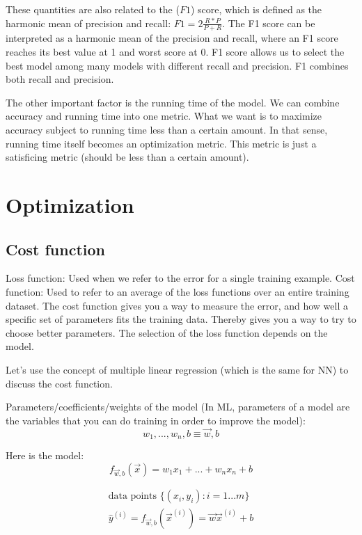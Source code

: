 \documentclass[12pt]{report}
\begin{document}
These quantities are also related to the ($F1$) score, which is defined as the harmonic mean of precision and recall: $F1 = 2 \frac{R * P}{ P + R } $. The F1 score can be interpreted as a harmonic mean of the precision and recall, where an F1 score reaches its best value at 1 and worst score at 0. F1 score allows us to select the best model among many models with different recall and precision. F1 combines both recall and precision.

The other important factor is the running time of the model. We can combine accuracy and running time into one metric. What we want is to maximize accuracy subject to running time less than a certain amount. In that sense, running time itself becomes an optimization metric. This metric is just a satisficing metric (should be less than a certain amount).

\section{Optimization}

\subsection{Cost function}
\label{sec:cost}
Loss function: Used when we refer to the error for a single training example. Cost function: Used to refer to an average of the loss functions over an entire training dataset.
The cost function gives you a way to measure the error, and how well a specific set of parameters fits the training data. Thereby gives you a way to try to choose better parameters. The selection of the loss function depends on the model.

Let's use the concept of multiple linear regression (which is the same for NN) to discuss the cost function.

Parameters/coefficients/weights of the model (In ML, parameters of a model are the variables that you can do training in order to improve the model):
\begin{equation}
  w_1, . . . , w_n , b \equiv \overrightarrow{w} ,b
\end{equation}

Here is the model:
\begin{equation}
	f_{\overrightarrow{w},b} (\overrightarrow{x}) = w_1x_1 +  ... + w_nx_n + b
\end{equation}

\begin{multline}
		\text{data points } \{(x_i, y_i): i=1 ... m \} \\
    \hat{y}^{(i)} = f_{\overrightarrow{w},b} (\overrightarrow{x}^{(i)})  = \overrightarrow{w} \overrightarrow{x} ^ {(i)} + b \\
\end{multline}
\end{document}
